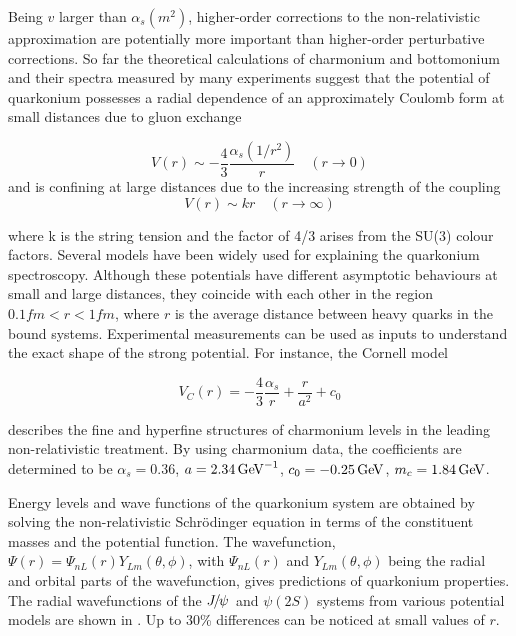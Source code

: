 \noindent Being $v$ larger than $\alpha_s(m^2)$, higher-order corrections to the 
non-relativistic approximation are potentially more important than higher-order
perturbative corrections. So far the theoretical calculations of charmonium and
bottomonium and their spectra measured by many experiments suggest that the
potential of quarkonium possesses a radial dependence of an approximately
Coulomb form at small distances due to gluon exchange

\begin{equation}
V(r) \sim -{\frac{4}{3}}{\frac{\alpha_s(1/r^2)}{r}} \quad (r\rightarrow 0)
\end{equation}
\noindent and is confining at large distances due to the increasing strength 
of the coupling
\begin{equation}
V(r) \sim kr \quad (r\rightarrow \infty)
\end{equation}

\noindent where k is the string tension and the factor of 4/3 arises from the
SU(3) colour factors. Several models have been widely used for explaining the
quarkonium spectroscopy. Although these potentials have different asymptotic
behaviours at small and large distances, they coincide with each other in the
region $0.1 fm < r <1 fm$, where $r$ is the average distance between heavy quarks
in the bound systems. Experimental measurements can be used as inputs to
understand the exact shape of the strong potential. For instance, the Cornell
model

\begin{equation}
V_C(r) = -{\frac{4}{3}}{\frac{\alpha_s}{r}} + {\frac{r}{a^2}} + c_0
\end{equation}  

\noindent describes the fine and hyperfine structures of charmonium levels in the leading
non-relativistic treatment. By using charmonium data, the coefficients are
determined to be $\alpha_s = 0.36$, $a=2.34 \mathrm{\,Ge\kern -0.1em V}^{-1}$, $c_0 = -0.25 \mathrm{\,Ge\kern -0.1em V}$, $m_c
= 1.84\mathrm{\,Ge\kern -0.1em V}$.

Energy levels and wave functions of the quarkonium system are obtained by solving 
the non-relativistic Schr\"odinger equation in terms of the constituent masses and the 
potential function. The wavefunction, $\Psi(r) = \Psi_{nL}(r)Y_{Lm}(\theta,\phi)$, with 
$\Psi_{nL}(r)$ and $Y_{Lm}(\theta,\phi)$ being the radial and orbital parts of the wavefunction, 
gives predictions of quarkonium properties. The radial wavefunctions of the ${{J\mskip -3mu/\mskip -2mu\psi\mskip 2mu}}$ and 
$\psi(2S)$ systems from various potential models are shown in . 
Up to 30\% differences can be noticed at small values of $r$. 

